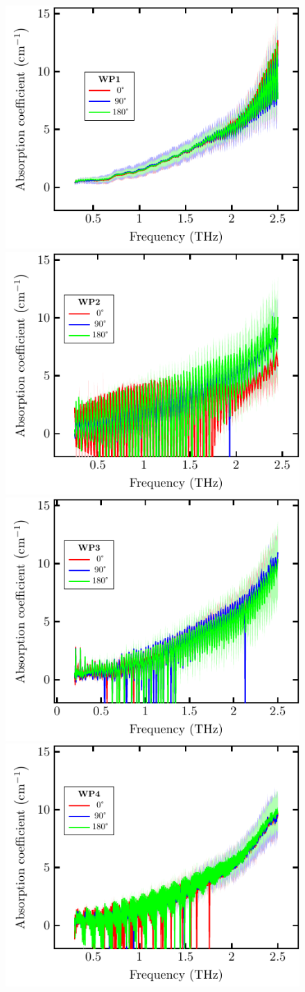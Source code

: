 \begin{figure}[H]
\centering
\subcaptionbox{\label{fig:ceramic_WP1_abs}}
    {\hspace*{-2em}\includegraphics[width=0.45\linewidth]{images/7_appendix/plots/real_abs/WP1.pdf}}
\qquad
\subcaptionbox{\label{fig:ceramic_WP2_abs}}
    {\hspace*{-2em}\includegraphics[width=0.45\linewidth]{images/7_appendix/plots/real_abs/WP2.pdf}}
\subcaptionbox{\label{fig:ceramic_WP3_abs}}
    {\hspace*{-2em}\includegraphics[width=0.45\linewidth]{images/7_appendix/plots/real_abs/WP3.pdf}}
\qquad
\subcaptionbox{\label{fig:ceramic_WP4_abs}}
    {\hspace*{-2em}\includegraphics[width=0.45\linewidth]{images/7_appendix/plots/real_abs/WP4.pdf}}

\end{figure}
